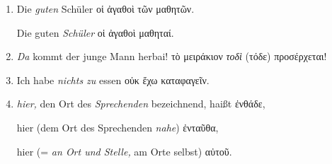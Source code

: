 \begin{enumerate}[leftmargin=0pt,rightmargin=0pt,listparindent =1cm,labelindent=1cm,labelsep=1ex,labelwidth={*},itemindent={*},align=left]
\begin{continuousitemline}
ich bin hergegangen \textgreek[variant=ancient]{ἐλήλυθα,}


ich bin gekommen \textgreek[variant=ancient]{ἥκω,}


ich bin wieder da \textgreek[variant=ancient]{ἥκω,}


bis ich wieder da bin \textgreek[variant=ancient]{μέχρι ἃν ἥκω,}


ich gehe \emph{(weiter)} \textgreek[variant=ancient]{χωρῶ,}


ich will ihn \emph{besuchen} \textgreek[variant=ancient]{εἶμι (εἴσειμι)
ὡς αὐτόν,}


ich werde kommen \textgreek[variant=ancient]{ἥξω.}


Ich will gehen, \emph{um} ihn zu befragen \textgreek[variant=ancient]{εἶμι
ἐρωτήσων αὐτόν.}


Ich komme her, \emph{um} mit\textcompwordmark{}zuspeisen \textgreek[variant=ancient]{ἔρχομαι
δειπνήσων.}


\emph{aus}gehen \textgreek[variant=ancient]{θύραζε ἐξιέναι} oder
\textgreek[variant=ancient]{θ. βαδίζειν.}\par\end{continuousitemline}

\item Die \emph{guten} Schüler \textgreek[variant=ancient]{οἱ ἀγαθοὶ τῶν
μαθητῶν.}


\begin{continuousitemline}Die guten \emph{Schüler} \textgreek[variant=ancient]{οἱ
ἀγαθοὶ μαθηταί.}\par\end{continuousitemline}

\item \emph{Da} kommt der junge Mann herbai! \textgreek[variant=ancient]{τὸ
μειράκιον \emph{τοδὶ} (τόδε) προσέρχεται!} 
\item Ich habe \emph{nichts zu} essen \textgreek[variant=ancient]{οὐκ ἔχω
καταφαγεῖν.}
\item \emph{hier,} den Ort des \emph{Sprechenden} bezeichnend, haißt \textgreek[variant=ancient]{ἐνθάδε,}


\begin{continuousitemline}hier (dem Ort des Sprechenden \emph{nahe})
\textgreek[variant=ancient]{ἐνταῦθα,}


hier (= \emph{an Ort und Stelle,} am Orte selbst) \textgreek[variant=ancient]{αὐτοῦ.}\par\end{continuousitemline}


\end{enumerate}
